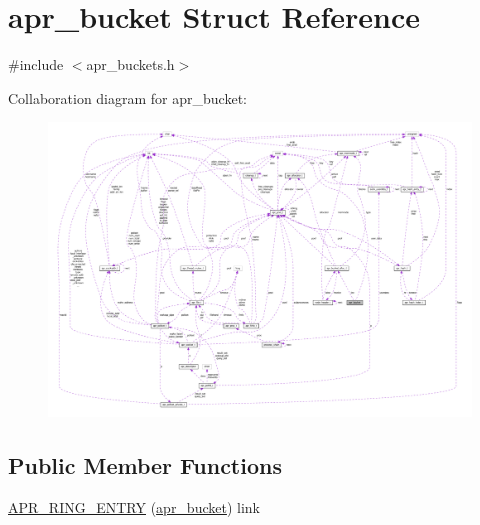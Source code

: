 \hypertarget{structapr__bucket}{}\section{apr\+\_\+bucket Struct Reference}
\label{structapr__bucket}


{\ttfamily \#include $<$apr\+\_\+buckets.\+h$>$}



Collaboration diagram for apr\+\_\+bucket\+:
\nopagebreak
\begin{figure}[H]
\begin{center}
\leavevmode
\includegraphics[width=350pt]{structapr__bucket__coll__graph}
\end{center}
\end{figure}
\subsection*{Public Member Functions}
\begin{DoxyCompactItemize}
\item 
\hyperlink{structapr__bucket_ab1acff965e57e067dfde80321d04dea7}{A\+P\+R\+\_\+\+R\+I\+N\+G\+\_\+\+E\+N\+T\+RY} (\hyperlink{structapr__bucket}{apr\+\_\+bucket}) link
\end{DoxyCompactItemize}
